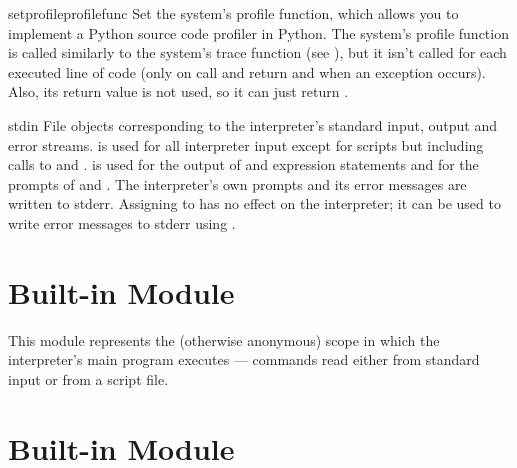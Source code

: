 \begin{funcdesc}{setprofile}{profilefunc}
  Set the system's profile function, which allows you to implement a
  Python source code profiler in Python.  The system's profile function
  is called similarly to the system's trace function (see
  ), but it isn't called for each executed line of
  code (only on call and return and when an exception occurs).  Also,
  its return value is not used, so it can just return .
\end{funcdesc}

\begin{datadesc}{stdin}
  File objects corresponding to the interpreter's standard input,
  output and error streams.   is used for all
  interpreter input except for scripts but including calls to
   and .   is used
  for the output of  and expression statements and for the
  prompts of  and .  The interpreter's
  own prompts and its error messages are written to stderr.  Assigning
  to  has no effect on the interpreter; it can be
  used to write error messages to stderr using .
\end{datadesc}

\section{Built-in Module }

This module represents the (otherwise anonymous) scope in which the
interpreter's main program executes --- commands read either from
standard input or from a script file.

\section{Built-in Module }

